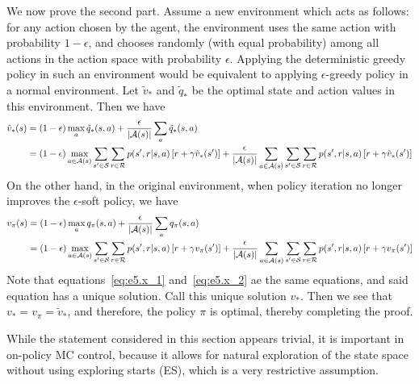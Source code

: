 \documentclass[10pt]{article}
\begin{document}
 	We now prove the second part. Assume a new environment which acts as follows: for any action chosen by the agent, the environment uses the same action with probability $1-\epsilon$, and chooses randomly (with equal probability) among all actions in the action space with probability $\epsilon$. Applying the deterministic greedy policy in such an environment would be equivalent to applying $\epsilon$-greedy policy in a normal environment. Let $\tilde{v}_*$ and $\tilde{q}_*$ be the optimal state and action values in this environment. Then we have
 	\begin{align}
 	\notag
 	\tilde{v}_*(s) &= (1-\epsilon) \max\limits_a \tilde{q}_* (s,a) + \frac{\epsilon}{|\mathcal{A}(s)|} \sum_a \tilde{q}_*(s,a)\\
 	\label{eq:e5.x_1}
 	&= (1-\epsilon) \max\limits_{a\in\mathcal{A}(s)} \sum_{s'\in\mathcal{S}} \sum_{r\in\mathcal{R}} p(s',r|s,a) \left[ r + \gamma\tilde{v}_*(s') \right] + \frac{\epsilon}{|\mathcal{A}(s)|} \sum_{a\in\mathcal{A}(s)} \sum_{s'\in\mathcal{S}} \sum_{r\in\mathcal{R}} p(s',r|s,a)\left[ r + \gamma\tilde{v}_* (s') \right]
 	\end{align}
 	On the other hand, in the original environment, when policy iteration no longer improves the $\epsilon$-soft policy, we have
 	\begin{align}
 	\notag
 	v_\pi(s) &= (1-\epsilon) \max\limits_a q_\pi(s,a) + \frac{\epsilon}{|\mathcal{A}(s)|} \sum_a q_\pi(s,a)\\
 	\label{eq:e5.x_2}
 	&= (1-\epsilon) \max\limits_{a\in\mathcal{A}(s)} \sum_{s'\in\mathcal{S}} \sum_{r\in\mathcal{R}} p(s',r|s,a) \left[ r + \gamma v_\pi(s') \right] + \frac{\epsilon}{|\mathcal{A}(s)|} \sum_{a\in\mathcal{A}(s)} \sum_{s'\in\mathcal{S}} \sum_{r\in\mathcal{R}} p(s',r|s,a)\left[ r + \gamma v_\pi(s') \right]
 	\end{align}
 	Note that equations~\eqref{eq:e5.x_1} and~\eqref{eq:e5.x_2} ae the same equations, and said equation has a unique solution. Call this unique solution $v_*$. Then we see that $v_*= v_\pi = \tilde{v}_* $, and therefore, the policy $\pi$ is optimal, thereby completing the proof.\par\noindent
 	While the statement considered in this section appears trivial, it is important in on-policy MC control, because it allows for natural exploration of the state space without using exploring starts (ES), which is a very restrictive assumption.
\end{document}
